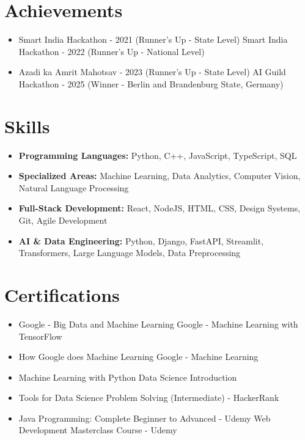\documentclass[a4paper,10pt]{article}
\begin{document}
\section*{Achievements}
\begin{itemize}
\item Smart India Hackathon - 2021 (Runner's Up - State Level) \hfill Smart India Hackathon - 2022 (Runner's Up - National Level)
\item Azadi ka Amrit Mahotsav - 2023 (Runner's Up - State Level) \hfill AI Guild Hackathon - 2025 (Winner - Berlin and Brandenburg State, Germany)
\end{itemize}

\section*{Skills}
\begin{itemize}
  \item \textbf{Programming Languages:} Python, C++, JavaScript, TypeScript, SQL
  \item \textbf{Specialized Areas:} Machine Learning, Data Analytics, Computer Vision, Natural Language Processing
  \item \textbf{Full-Stack Development:} React, NodeJS, HTML, CSS, Design Systems, Git, Agile Development
  \item \textbf{AI \& Data Engineering:} Python, Django, FastAPI, Streamlit, Transformers, Large Language Models, Data Preprocessing
\end{itemize}

\section*{Certifications}
\begin{itemize}
\item Google - Big Data and Machine Learning \hfill Google - Machine Learning with TensorFlow
\item How Google does Machine Learning \hfill Google - Machine Learning
\item Machine Learning with Python \hfill Data Science Introduction
\item Tools for Data Science \hfill Problem Solving (Intermediate) - HackerRank
\item Java Programming: Complete Beginner to Advanced - Udemy \hfill Web Development Masterclass Course - Udemy
\end{itemize}
\end{document}
